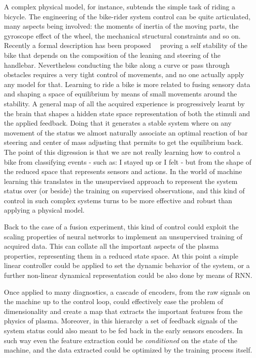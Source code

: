 A complex physical model, for instance, subtends the simple task of riding a bicycle. The engineering of the bike-rider system control can be quite articulated, many aspects being involved: the moments of inertia of the moving parts, the gyroscope effect of the wheel, the mechanical structural constraints and so on. 
Recently a formal description has been proposed~\cite{rideabike_nature_2016}~\cite{papadopulos_bike} proving a self stability of the bike that depends on the composition of the leaning and steering of the handlebar. Nevertheless conducting the bike along a curve or pass through obstacles requires a very tight control of movements, and no one actually apply any model for that. Learning to ride a bike is more related to fusing sensory data and shaping a space of equilibrium by means of small movements around the stability. A general map of all the acquired experience is progressively learnt by the brain that shapes a hidden state space representation of both the stimuli and the applied feedback. Doing that it generates a stable system where on any movement of the status we almost naturally associate an optimal reaction of bar steering and center of mass adjusting that permits to get the equilibrium back.
The point of this digression is that we are not really learning how to control a bike from classifying events - such as: I stayed up or I felt - but from the shape of the reduced space that represents sensors and actions. In the world of machine learning this translates in the unsupervised approach to represent the system status over (or beside) the training on supervised observations, and this kind of control in such complex systems turns to be more effective and robust than applying a physical model.

Back to the case of a fusion experiment, this kind of control could exploit the scaling properties of neural networks to implement an unsupervised training of acquired data. This can collate all the important aspects of the plasma properties, representing them in a reduced state space. At this point a simple linear controller could be applied to set the dynamic behavior of the system, or a further non-linear dynamical representation could be also done by means of \acl{RNN}.

Once applied to many diagnostics, a cascade of encoders, from the raw signals on the machine up to the control loop, could effectively ease the problem of dimensionality and create a map that extracts the important features from the physics of plasma. Moreover, in this hierarchy a set of feedback signals of the system status could also meant to be fed back in the early sensors encoders. In such way even the feature extraction could be \textit{conditioned} on the state of the machine, and the data extracted could be optimized by the training process itself.

